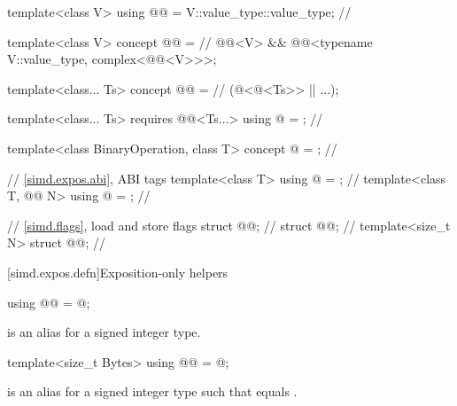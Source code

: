 \begin{codeblock}
template<class V>
  using @@ = V::value_type::value_type; // \expos

template<class V>
  concept @@ =                                             // \expos
    @@<V> && @@<typename V::value_type, complex<@@<V>>>;

template<class... Ts>
  concept @@ =                                      // \expos
    (@<@<Ts>> || ...);

template<class... Ts>
  requires @@<Ts...>
    using @ = \seebelownc@;                            // \expos

template<class BinaryOperation, class T>
  concept @ = \seebelownc@;                    // \expos

// \ref{simd.expos.abi},  ABI tags
template<class T> using @ = \seebelownc@;                      // \expos
template<class T, @@ N> using @ = \seebelownc@;  // \expos

// \ref{simd.flags}, load and store flags
struct @@;                                                 // \expos
struct @@;                                                 // \expos
template<size_t N> struct @@;                          // \expos
\end{codeblock}

[simd.expos.defn]{Exposition-only helpers}

\begin{itemdecl}
using @@ = @\seebelow@;
\end{itemdecl}

\begin{itemdescr}
\pnum
{} is an alias for a signed integer type.
\end{itemdescr}

\begin{itemdecl}
template<size_t Bytes> using @@ = @\seebelow@;
\end{itemdecl}

\begin{itemdescr}
\pnum
{} is an alias for a signed integer type
 such that  equals .
\end{itemdescr}

